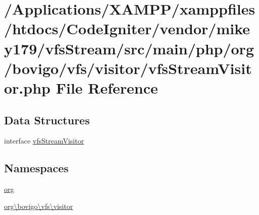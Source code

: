 \hypertarget{vfs_stream_visitor_8php}{}\section{/\+Applications/\+X\+A\+M\+P\+P/xamppfiles/htdocs/\+Code\+Igniter/vendor/mikey179/vfs\+Stream/src/main/php/org/bovigo/vfs/visitor/vfs\+Stream\+Visitor.php File Reference}
\label{vfs_stream_visitor_8php}
\subsection*{Data Structures}
\begin{DoxyCompactItemize}
\item 
interface \mbox{\hyperlink{interfaceorg_1_1bovigo_1_1vfs_1_1visitor_1_1vfs_stream_visitor}{vfs\+Stream\+Visitor}}
\end{DoxyCompactItemize}
\subsection*{Namespaces}
\begin{DoxyCompactItemize}
\item 
 \mbox{\hyperlink{namespaceorg}{org}}
\item 
 \mbox{\hyperlink{namespaceorg_1_1bovigo_1_1vfs_1_1visitor}{org\textbackslash{}bovigo\textbackslash{}vfs\textbackslash{}visitor}}
\end{DoxyCompactItemize}
